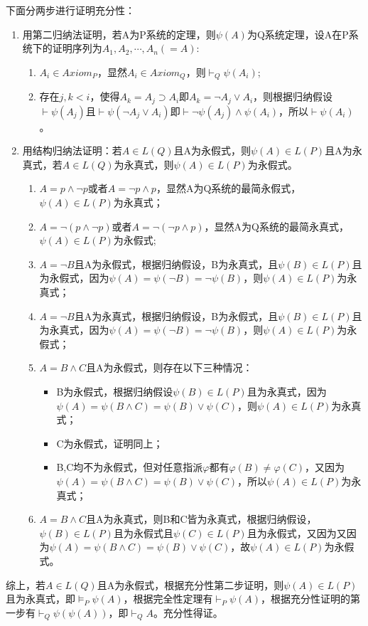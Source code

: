 \documentclass[a4paper]{ctexart}
\begin{document}
\noindent 下面分两步进行证明充分性：
\begin{enumerate}
  \item 用第二归纳法证明，若A为P系统的定理，则$\psi(A)$为Q系统定理，设A在P系统下的证明序列为$A_1,A_2,\cdots,A_n(=A)$:
  \begin{enumerate}
    \item $A_i\in Axiom_P$，显然$A_i\in Axiom_Q$，则$\vdash_Q\psi(A_i)$;
    \item 存在$j,k<i$，使得$A_k=A_j\supset A_i$即$A_k=\neg A_j\vee A_i$，则根据归纳假设$\vdash \psi(A_j)$且$\vdash \psi(\neg A_j\vee A_i)$即$\vdash \neg\psi(A_j)\wedge \psi(A_i)$，所以$\vdash\psi(A_i)$。
  \end{enumerate}
  \item 用结构归纳法证明：若$A\in L(Q)$且A为永假式，则$\psi(A)\in L(P)$且A为永真式，若$A\in L(Q)$为永真式，则$\psi(A)\in L(P)$为永假式。
  \begin{enumerate}
    \item $A=p\wedge\neg p$或者$A=\neg p\wedge p$，显然A为Q系统的最简永假式，$\psi(A)\in L(P)$为永真式；
    \item $A=\neg(p\wedge\neg p)$或者$A=\neg(\neg p\wedge p)$，显然A为Q系统的最简永真式，$\psi(A)\in L(P)$为永假式;
    \item $A=\neg B$且A为永假式，根据归纳假设，B为永真式，且$\psi(B)\in L(P)$且为永假式，因为$\psi(A)=\psi(\neg B)=\neg\psi(B)$，则$\psi(A)\in L(P)$为永真式；
    \item $A=\neg B$且A为永真式，根据归纳假设，B为永假式，且$\psi(B)\in L(P)$且为永真式，因为$\psi(A)=\psi(\neg B)=\neg\psi(B)$，则$\psi(A)\in L(P)$为永假式；
    \item $A=B\wedge C$且A为永假式，则存在以下三种情况：
    \begin{itemize}
      \item B为永假式，根据归纳假设$\psi(B)\in L(P)$且为永真式，因为$\psi(A)=\psi(B\wedge C)=\psi(B)\vee \psi(C)$，则$\psi(A)\in L(P)$为永真式；
      \item C为永假式，证明同上；
      \item B,C均不为永假式，但对任意指派$\varphi$都有$\varphi(B)\neq \varphi(C)$，又因为$\psi(A)=\psi(B\wedge C)=\psi(B)\vee \psi(C)$，所以$\psi(A)\in L(P)$为永真式；
    \end{itemize}
    \item $A=B\wedge C$且A为永真式，则B和C皆为永真式，根据归纳假设，$\psi(B)\in L(P)$且为永假式且$\psi(C)\in L(P)$且为永假式，又因为又因为$\psi(A)=\psi(B\wedge C)=\psi(B)\vee \psi(C)$，故$\psi(A)\in L(P)$为永假式。
  \end{enumerate}
\end{enumerate}
综上，若$A\in L(Q)$且A为永假式，根据充分性第二步证明，则$\psi(A)\in L(P)$且为永真式，即$\models_P\psi(A)$，根据完全性定理有$\vdash_P\psi(A)$，根据充分性证明的第一步有$\vdash_Q \psi(\psi(A))$，即$\vdash_QA$。充分性得证。\newline
\end{document}
